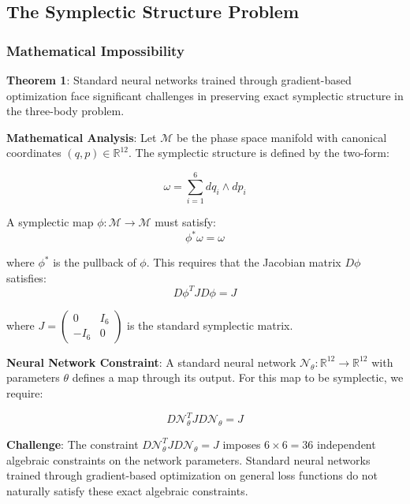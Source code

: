 \documentclass[11pt,a4paper]{article}
\begin{document}
\subsection{The Symplectic Structure Problem}

\subsubsection{Mathematical Impossibility}

\textbf{Theorem 1}: Standard neural networks trained through gradient-based optimization face significant challenges in preserving exact symplectic structure in the three-body problem.

\textbf{Mathematical Analysis}: 
Let $\mathcal{M}$ be the phase space manifold with canonical coordinates $(q, p) \in \mathbb{R}^{12}$. The symplectic structure is defined by the two-form:

\begin{equation}
\omega = \sum_{i=1}^{6} dq_i \wedge dp_i
\end{equation}

A symplectic map $\phi: \mathcal{M} \rightarrow \mathcal{M}$ must satisfy:
\begin{equation}
\phi^*\omega = \omega
\end{equation}

where $\phi^*$ is the pullback of $\phi$. This requires that the Jacobian matrix $D\phi$ satisfies:
\begin{equation}
D\phi^T J D\phi = J
\end{equation}

where $J = \begin{pmatrix} 0 & I_6 \\ -I_6 & 0 \end{pmatrix}$ is the standard symplectic matrix.

\textbf{Neural Network Constraint}: A standard neural network $\mathcal{N}_\theta: \mathbb{R}^{12} \rightarrow \mathbb{R}^{12}$ with parameters $\theta$ defines a map through its output. For this map to be symplectic, we require:

\begin{equation}
D\mathcal{N}_\theta^T J D\mathcal{N}_\theta = J
\end{equation}

\textbf{Challenge}: The constraint $D\mathcal{N}_\theta^T J D\mathcal{N}_\theta = J$ imposes $6 \times 6 = 36$ independent algebraic constraints on the network parameters. Standard neural networks trained through gradient-based optimization on general loss functions do not naturally satisfy these exact algebraic constraints.
\end{document}
